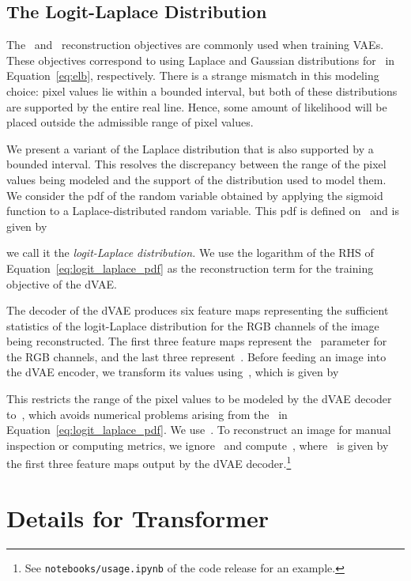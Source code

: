 \documentclass{article}
\begin{document}
\subsection{The Logit-Laplace Distribution}
\label{sec:dvae_logit_laplace}

The~ and~ reconstruction objectives are commonly used when training VAEs. These objectives correspond to using Laplace and Gaussian distributions for~ in Equation~\ref{eq:elb}, respectively. There is a strange mismatch in this modeling choice: pixel values lie within a bounded interval, but both of these distributions are supported by the entire real line. Hence, some amount of likelihood will be placed outside the admissible range of pixel values.

We present a variant of the Laplace distribution that is also supported by a bounded interval. This resolves the discrepancy between the range of the pixel values being modeled and the support of the distribution used to model them. We consider the pdf of the random variable obtained by applying the sigmoid function to a Laplace-distributed random variable. This pdf is defined on~ and is given by

we call it the \emph{logit-Laplace distribution.} We use the logarithm of the RHS of Equation~\ref{eq:logit_laplace_pdf} as the reconstruction term for the training objective of the dVAE.

The decoder of the dVAE produces six feature maps representing the sufficient statistics of the logit-Laplace distribution for the RGB channels of the image being reconstructed. The first three feature maps represent the~ parameter for the RGB channels, and the last three represent~. Before feeding an image into the dVAE encoder, we transform its values using~, which is given by

This restricts the range of the pixel values to be modeled by the dVAE decoder to~, which avoids numerical problems arising from the~ in Equation~\ref{eq:logit_laplace_pdf}. We use~. To reconstruct an image for manual inspection or computing metrics, we ignore~ and compute~, where~ is given by the first three feature maps output by the dVAE decoder.\footnote{See \texttt{notebooks/usage.ipynb} of the code release for an example.}

\section{Details for Transformer}
\end{document}
